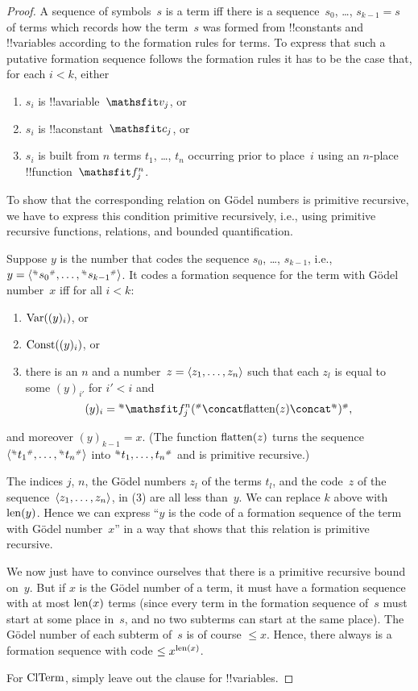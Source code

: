 \documentclass[../../../include/open-logic-section]{subfiles}
\begin{document}
\begin{proof}
A sequence of symbols~$s$ is a term iff there is a sequence~$s_0$,
\dots, $s_{k-1} = s$ of terms which records how the term~$s$ was formed
from !!{constant}s and !!{variable}s according to the formation rules
for terms. To express that such a putative formation sequence follows
the formation rules it has to be the case that, for each $i < k$, either
\begin{enumerate}
\item $s_i$ is !!a{variable}~$\Obj v_j$, or
\item $s_i$ is !!a{constant}~$\Obj c_j$, or
\item $s_i$ is built from $n$ terms $t_1$, \dots, $t_n$ occurring
  prior to place~$i$ using an $n$-place !!{function}~$\Obj f^n_j$.
\end{enumerate}
To show that the corresponding relation on G\"odel numbers is
primitive recursive, we have to express this condition primitive
recursively, i.e., using primitive recursive functions, relations, and
bounded quantification.

Suppose $y$ is the number that codes the sequence $s_0$, \dots, $s_{k-1}$,
i.e., $y = \tuple{\Gn{s_0}, \dots, \Gn{s_{k-1}}}$.  It codes a formation
sequence for the term with G\"odel number~$x$ iff for all $i < k$:
\begin{enumerate}
\item $\mathrm{Var}((y)_i)$, or
\item $\mathrm{Const}((y)_i)$, or
\item there is an $n$ and a number~$z = \langle z_1, \dots, z_n \rangle$ such
  that each $z_l$ is equal to some $(y)_{i'}$ for $i' < i$ and
\[
(y)_i = \Gn{\Obj f^n_j(} \concat \fn{flatten}(z) \concat \Gn{)},
\]
\end{enumerate}
and moreover $(y)_{k-1} = x$.  (The function $\mathrm{flatten}(z)$ turns
the sequence $\tuple{\Gn{t_1}, \dots, \Gn{t_n}}$ into $\Gn{t_1, \dots,
  t_n}$ and is primitive recursive.)

The indices $j$, $n$, the G\"odel numbers $z_l$ of the terms $t_l$,
and the code~$z$ of the sequence~$\langle z_1, \dots, z_n \rangle$, in (3) are
all less than~$y$.  We can replace $k$ above with $\mathrm{len}(y)$.  Hence we
can express ``$y$ is the code of a formation sequence of the term with
G\"odel number~$x$'' in a way that shows that this relation is
primitive recursive.

We now just have to convince ourselves that there is a primitive
recursive bound on~$y$.  But if $x$ is the G\"odel number of a term,
it must have a formation sequence with at most $\mathrm{len}(x)$ terms (since
every term in the formation sequence of~$s$ must start at some place
in~$s$, and no two subterms can start at the same place).  The G\"odel
number of each subterm of~$s$ is of course $\le x$.  Hence, there
always is a formation sequence with code $\le x^{\mathrm{len}(x)}$.

For $\mathrm{ClTerm}$, simply leave out the clause for !!{variable}s.
\end{proof}
\end{document}
